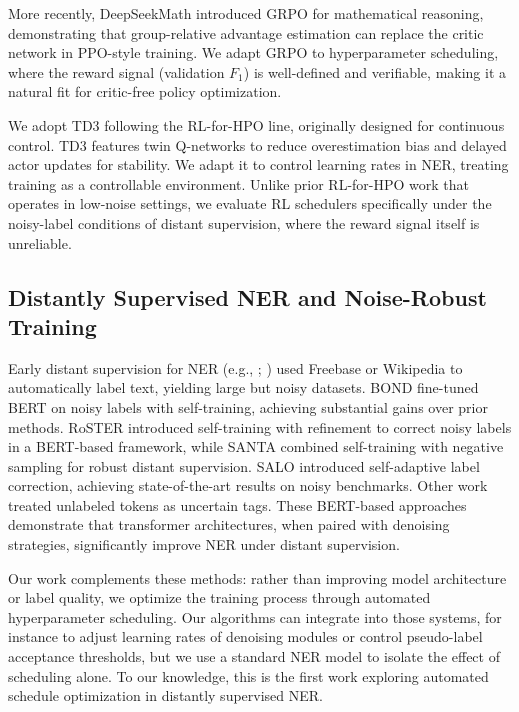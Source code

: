 \documentclass[11pt]{article}
\begin{document}
More recently, DeepSeekMath \cite{shao2024deepseekmath} introduced GRPO for mathematical reasoning, demonstrating that group-relative advantage estimation can replace the critic network in PPO-style training. We adapt GRPO to hyperparameter scheduling, where the reward signal (validation $F_1$) is well-defined and verifiable, making it a natural fit for critic-free policy optimization.

We adopt TD3 \cite{fujimoto2018td3} following the RL-for-HPO line, originally designed for continuous control. TD3 features twin Q-networks to reduce overestimation bias and delayed actor updates for stability. We adapt it to control learning rates in NER, treating training as a controllable environment. Unlike prior RL-for-HPO work that operates in low-noise settings, we evaluate RL schedulers specifically under the noisy-label conditions of distant supervision, where the reward signal itself is unreliable.

\subsection{Distantly Supervised NER and Noise-Robust Training}

Early distant supervision for NER (e.g., \cite{augenstein2017distant}; \cite{peng2019distant}) used Freebase or Wikipedia to automatically label text, yielding large but noisy datasets. BOND \cite{liang2020bond} fine-tuned BERT on noisy labels with self-training, achieving substantial gains over prior methods. RoSTER \cite{meng2021roster} introduced self-training with refinement to correct noisy labels in a BERT-based framework, while SANTA \cite{shao2023santa} combined self-training with negative sampling for robust distant supervision. SALO \cite{li2022salo} introduced self-adaptive label correction, achieving state-of-the-art results on noisy benchmarks. Other work \cite{mayhew2019ner} treated unlabeled tokens as uncertain tags. These BERT-based approaches demonstrate that transformer architectures, when paired with denoising strategies, significantly improve NER under distant supervision.

Our work complements these methods: rather than improving model architecture or label quality, we optimize the training process through automated hyperparameter scheduling. Our algorithms can integrate into those systems, for instance to adjust learning rates of denoising modules or control pseudo-label acceptance thresholds, but we use a standard NER model to isolate the effect of scheduling alone. To our knowledge, this is the first work exploring automated schedule optimization in distantly supervised NER.
\end{document}
